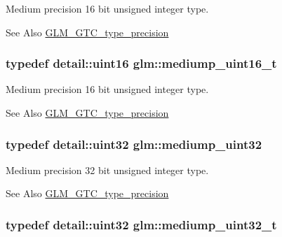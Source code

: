 Medium precision 16 bit unsigned integer type. \begin{DoxySeeAlso}{See Also}
\hyperlink{group__gtc__type__precision}{G\-L\-M\-\_\-\-G\-T\-C\-\_\-type\-\_\-precision} 
\end{DoxySeeAlso}
\hypertarget{group__gtc__type__precision_ga0b385466deac5ac96061ef2cdd6db20f}{
\subsubsection[{mediump\-\_\-uint16\-\_\-t}]{\setlength{\rightskip}{0pt plus 5cm}typedef detail\-::uint16 {\bf glm\-::mediump\-\_\-uint16\-\_\-t}}}\label{group__gtc__type__precision_ga0b385466deac5ac96061ef2cdd6db20f}
Medium precision 16 bit unsigned integer type. \begin{DoxySeeAlso}{See Also}
\hyperlink{group__gtc__type__precision}{G\-L\-M\-\_\-\-G\-T\-C\-\_\-type\-\_\-precision} 
\end{DoxySeeAlso}
\hypertarget{group__gtc__type__precision_ga861dbd1051f488e425b3966001b568e5}{
\subsubsection[{mediump\-\_\-uint32}]{\setlength{\rightskip}{0pt plus 5cm}typedef detail\-::uint32 {\bf glm\-::mediump\-\_\-uint32}}}\label{group__gtc__type__precision_ga861dbd1051f488e425b3966001b568e5}
Medium precision 32 bit unsigned integer type. \begin{DoxySeeAlso}{See Also}
\hyperlink{group__gtc__type__precision}{G\-L\-M\-\_\-\-G\-T\-C\-\_\-type\-\_\-precision} 
\end{DoxySeeAlso}
\hypertarget{group__gtc__type__precision_gac7782c1e393f9ad47e41a177a685f287}{
\subsubsection[{mediump\-\_\-uint32\-\_\-t}]{\setlength{\rightskip}{0pt plus 5cm}typedef detail\-::uint32 {\bf glm\-::mediump\-\_\-uint32\-\_\-t}}}\label{group__gtc__type__precision_gac7782c1e393f9ad47e41a177a685f287}
